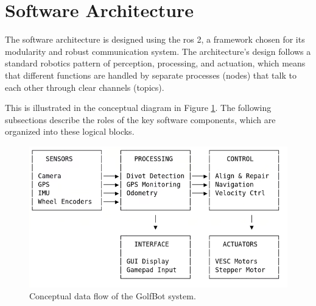 

\section{Software Architecture}
\label{sec:software_architecture}
The software architecture is designed using the \gls{ros} 2, a framework chosen for its modularity and robust communication system. The architecture's design follows a standard robotics pattern of perception, processing, and actuation, which means that different functions are handled by separate processes (nodes) that talk to each other through clear channels (topics). 

This is illustrated in the conceptual diagram in Figure \ref{fig:conceptual_flow}. The following subsections describe the roles of the key software components, which are organized into these logical blocks.

\begin{figure}[h!]
    \centering
    \includegraphics[width=1\linewidth]{figures/data_flow_diagram.png}
    \caption{Conceptual data flow of the GolfBot system.}
    \label{fig:conceptual_flow}
\end{figure}

